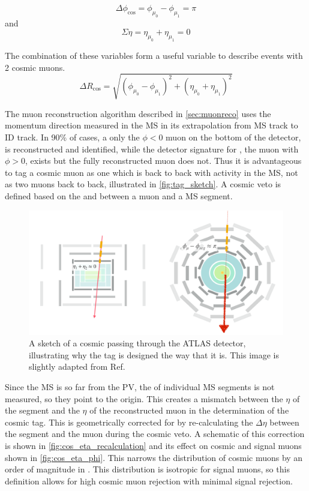 \begin{equation}
\Delta \phi_{\text{cos}} = \phi_{\mu_{0}} - \phi_{\mu_{1}} = \pi 
\end{equation}
and 
\begin{equation}
\Sigma \eta = \eta_{\mu_{0}} + \eta_{\mu_{1}} = 0
\end{equation} 

The combination of these variables form a useful variable to describe events with 2 cosmic muons.
\begin{equation}
\Delta R_{\text{cos}} = \sqrt{ (\phi_{\mu_{0}} - \phi_{\mu_{1}})^{2} + (\eta_{\mu_{0}} + \eta_{\mu_{1}})^2}
\end{equation}

The muon reconstruction algorithm described in \autoref{sec:muonreco} uses the momentum direction measured in the \ac{MS} in its extrapolation from \ac{MS} track to \ac{ID} track. In 90\% of cases, a only the  $\phi < 0$ muon on the bottom of the detector, \mb is reconstructed and identified, while the detector signature for \mt, the muon with $\phi > 0$, exists but the fully reconstructed muon does not. Thus it is advantageous to tag a cosmic muon as one which is back to back with activity in the \ac{MS}, not as two muons back to back, illustrated in \autoref{fig:tag_sketch}. A cosmic veto is defined based on the \dphicos and \sigeta between a muon and a \ac{MS} segment. 

\begin{figure}[!ht]
\centering
\includegraphics[width=.8\textwidth]{figures/cosmics/tag_sketch.png}
\caption{A sketch of a cosmic passing through the ATLAS detector, illustrating why the tag is designed the way that it is. This image is slightly adapted from Ref.~\cite{ATLAS-CONF-2019-006}}
\label{fig:tag_sketch}
\end{figure}

Since the \ac{MS} is so far from the \ac{PV}, the \z of individual MS segments is not measured, so they point to the origin. This creates a mismatch between the $\eta$ of the segment and the $\eta$ of the reconstructed muon in the determination of the cosmic tag. This is geometrically corrected for by re-calculating the $\Delta\eta$ between the segment and the muon during the cosmic veto. A schematic of this correction is shown in \autoref{fig:cos_eta_recalculation} and its effect on cosmic and signal muons shown in \autoref{fig:cos_eta_phi}. This narrows the distribution of cosmic muons by an order of magnitude in \sigeta. This distribution is isotropic for signal muons, so this definition allows for high cosmic muon rejection with minimal signal rejection. 

